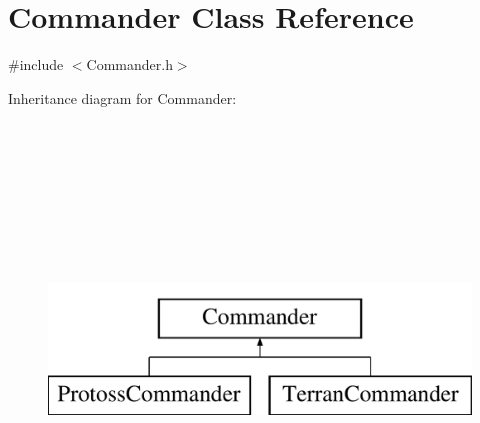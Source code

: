 \hypertarget{class_commander}{\section{Commander Class Reference}
\label{class_commander}
}


{\ttfamily \#include $<$Commander.\-h$>$}

Inheritance diagram for Commander\-:\begin{figure}[H]
\begin{center}
\leavevmode
\includegraphics[height=12.000000cm]{class_commander}
\end{center}
\end{figure}
